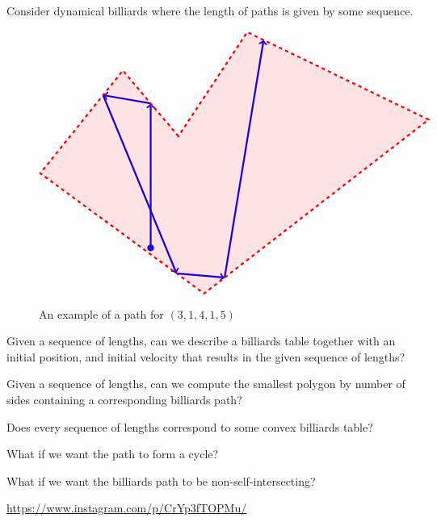 \documentclass{article}
\begin{document}
Consider dynamical billiards where the length of paths is given by some sequence.
\begin{figure}[ht!]
  \[
  \begin{tikzpicture}[scale=1.5]
    \fill[blue] (0,0) circle (0.07);
    \draw[ultra thick, blue, ->] (0,0) -- (0,3);
    \draw[ultra thick, blue, ->] (0,3) -- (-0.985392, 3.1703);
    \draw[ultra thick, blue, ->] (-0.985392, 3.1703) -- (0.535414, -0.529314);
    \draw[ultra thick, blue, ->] (0.535414, -0.529314) -- (1.53149, -0.617783);
    \draw[ultra thick, blue, ->] (1.53149, -0.617783) -- (2.33959, 4.31648);
    \draw[ultra thick, red, dashed, fill=red, fill opacity=0.1]
      (0.574636,2.31753)--
      (0, 3)--
      (-0.574636, 3.68247)--
      (-2.28623, 1.5483)--
      (1.10503, -0.948726)--
      (5.75844, 2.66237)--
      (2.33959, 4.31648)--
      (2., 4.48078)--
      cycle;
  \end{tikzpicture}
  \]
  \caption{
    An example of a path for $(3,1,4,1,5)$
  }
\end{figure}

\begin{question}
  Given a sequence of lengths, can we describe a billiards table together with an initial position, and initial velocity that results in the given sequence of lengths?
\end{question}

\begin{related}
  \item Given a sequence of lengths, can we compute the smallest polygon by number of sides containing a corresponding billiards path?
  \item Does every sequence of lengths correspond to some convex billiards table?
  \item What if we want the path to form a cycle?
  \item What if we want the billiards path to be non-self-intersecting?
\end{related}

\begin{references}
  \item \url{https://www.instagram.com/p/CrYp3fTOPMu/}
\end{references}
\end{document}
